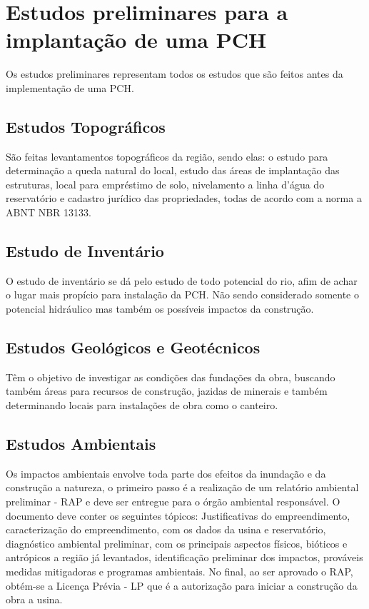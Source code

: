 \chapter{Estudos preliminares para a implantação de uma PCH}\label{cap:CnptDsng}
Os estudos preliminares representam todos os estudos que são feitos antes da implementação de uma PCH.
\section{Estudos Topográficos}
São feitas levantamentos topográficos da região, sendo elas: o estudo para determinação a queda natural do local, estudo das áreas de implantação das estruturas, local para empréstimo de solo, nivelamento a linha d'água do reservatório e cadastro jurídico das propriedades, todas de acordo com a norma a ABNT NBR 13133.
\section{Estudo de Inventário}
O estudo de inventário se dá pelo estudo de todo potencial do rio, afim de achar o lugar mais propício para instalação da  PCH. Não sendo considerado somente o potencial hidráulico mas também os possíveis impactos da construção.

\section{Estudos Geológicos e Geotécnicos}
Têm o objetivo de investigar as condições das fundações da obra, buscando também áreas para recursos de construção, jazidas de minerais e também determinando locais para instalações de obra como o canteiro.

\section{Estudos Ambientais}
Os impactos ambientais envolve toda parte dos efeitos da inundação e da construção a natureza, o primeiro passo é a realização de um relatório ambiental preliminar - RAP e deve ser entregue para o órgão ambiental responsável. 
O documento deve conter os seguintes tópicos: Justificativas do empreendimento, caracterização do empreendimento, com os dados da usina e reservatório, diagnóstico ambiental preliminar, com os principais aspectos físicos, bióticos e antrópicos a região já levantados, identificação preliminar dos impactos, prováveis medidas mitigadoras e programas ambientais.
No final, ao ser aprovado o RAP, obtém-se a Licença Prévia - LP que é a autorização para iniciar a construção da obra a usina.

